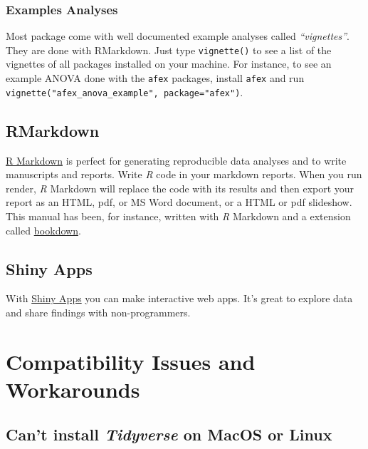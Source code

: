 \documentclass[
]{scrartcl}
\begin{document}
\hypertarget{examples-analyses}{%
\subsubsection*{Examples Analyses}\label{examples-analyses}}

Most package come with well documented example analyses called \emph{``vignettes''}. They are done with RMarkdown. Just type \texttt{vignette()} to see a list of the vignettes of all packages installed on your machine. For instance, to see an example ANOVA done with the \texttt{afex} packages, install \texttt{afex} and run \texttt{vignette("afex\_anova\_example",\ package="afex")}.

\hypertarget{rmarkdown}{%
\subsection*{RMarkdown}\label{rmarkdown}}

\href{https://rmarkdown.rstudio.com/}{R Markdown} is perfect for generating reproducible data analyses and to write manuscripts and reports. Write \emph{R} code in your markdown reports. When you run render, \emph{R} Markdown will replace the code with its results and then export your report as an HTML, pdf, or MS Word document, or a HTML or pdf slideshow. This manual has been, for instance, written with \emph{R} Markdown and a extension called \href{https://www.bookdown.org/}{bookdown}.

\hypertarget{shiny-apps}{%
\subsection*{Shiny Apps}\label{shiny-apps}}

With \href{https://shiny.rstudio.com/}{Shiny Apps} you can make interactive web apps. It's great to explore data and share findings with non-programmers.

\hypertarget{compatibility-issues-and-workarounds}{%
\section{Compatibility Issues and Workarounds}\label{compatibility-issues-and-workarounds}}

\hypertarget{tidyverseinstall}{%
\subsection{\texorpdfstring{Can't install \emph{Tidyverse} on MacOS or Linux}{Can't install Tidyverse on MacOS or Linux}}\label{tidyverseinstall}}
\end{document}
